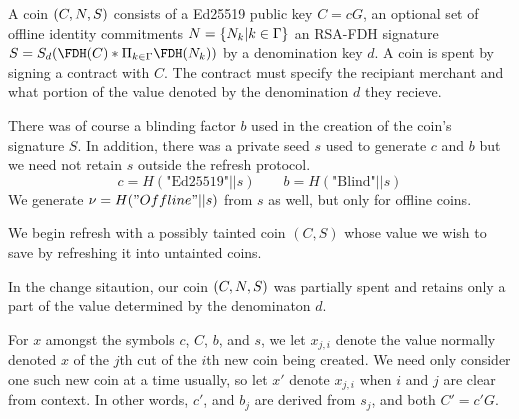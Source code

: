 \documentclass{llncs}
\begin{document}
A coin $(C,N,S)$ consists of 
  a Ed25519 public key $C = c G$, 
  an optional set of offline identity commitments $N = \{N_k | k \in \Gamma \}$
  an RSA-FDH signature $S = S_d(\FDH(C) * \Pi_{k \in \Gamma} \FDH(\Nu_k))$ by a denomination key $d$.
A coin is spent by signing a contract with $C$.  The contract must
specify the recipiant merchant and what portion of the value denoted
by the denomination $d$ they recieve.

There was of course a blinding factor $b$ used in the creation of
the coin's signature $S$.  In addition, there was a private seed $s$
used to generate $c$ and $b$ but we need not retain $s$
outside the refresh protocol.
$$ c = H(\textrm{"Ed25519"} || s)
\qquad b = H(\textrm{"Blind"} || s) $$
We generate $\nu = H("Offline" || s)$ from $s$ as well,
 but only for offline coins.

\smallskip

We begin refresh with a possibly tainted coin $(C,S)$ whose value
we wish to save by refreshing it into untainted coins.  

In the change sitaution, our coin $(C,N,S)$ was partially spent and 
retains only a part of the value determined by the denominaton $d$.

For $x$ amongst the symbols $c$, $C$, $b$, and $s$,
we let $x_{j,i}$ denote the value normally denoted $x$ of
 the $j$th cut of the $i$th new coin being created. 
We need only consider one such new coin at a time usually, 
so let $x'$ denote $x_{j,i}$ when $i$ and $j$ are clear from context.
In other words, $c'$, and $b_j$ are derived from $s_j$,
 and both $C' = c' G$.
\end{document}
